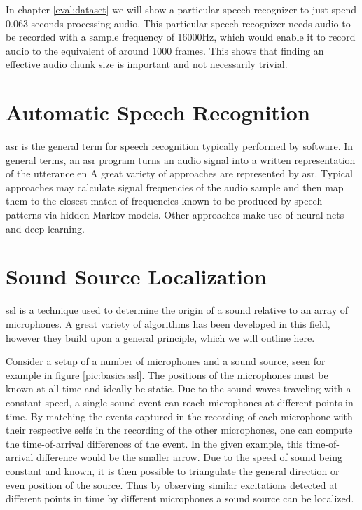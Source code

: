In chapter \ref{eval:dataset} we will show a particular speech recognizer to just spend 0.063 seconds processing audio.
This particular speech recognizer needs audio to be recorded with a sample frequency of 16000Hz, which would enable it to record audio to the equivalent
of around 1000 frames. %
This shows that finding an effective audio chunk size is important and not necessarily trivial.

\section{Automatic Speech Recognition}
\gls{asr} is the general term for speech recognition typically performed by software.
In general terms, an \gls{asr} program turns an audio signal into a written representation of the utterance en
A great variety of approaches are represented by \gls{asr}.
Typical approaches may calculate signal frequencies of the audio sample and then map them to the closest match of frequencies known to be produced by speech patterns via hidden Markov models.
Other approaches make use of neural nets and deep learning.

\section{Sound Source Localization}
\label{basics:ssl}
\gls{ssl} is a technique used to determine the origin of a sound relative to an array of microphones.
A great variety of algorithms has been developed in this field, however they build upon a general principle, which we will outline here.

Consider a setup of a number of microphones and a sound source, seen for example in figure \ref{pic:basics:ssl}.
The positions of the microphones must be known at all time and ideally be static.
Due to the sound waves traveling with a constant speed, a single sound event can reach microphones at different points in time.
By matching the events captured in the recording of each microphone with their respective selfs in the recording of the other microphones, one can compute the time-of-arrival differences of the event.
In the given example, this time-of-arrival difference would be the smaller arrow.
Due to the speed of sound being constant and known, it is then possible to triangulate the general direction or even position of the source.
Thus by observing similar excitations detected at different points in time by different microphones a sound source can be localized.

